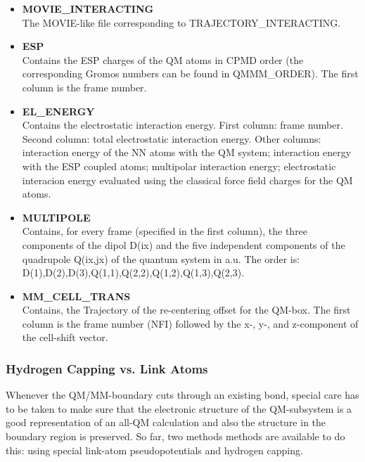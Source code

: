 \documentclass[twoside,10pt,titlepage,a4paper]{article}
\begin{document}
\begin{itemize}
\item {\bf MOVIE\_INTERACTING}\\
The MOVIE-like file corresponding to TRAJECTORY\_INTERACTING.

%
%

\item {\bf ESP}\\
Contains the ESP charges of the QM atoms in CPMD order (the corresponding Gromos
numbers can be found in QMMM\_ORDER). The first column is the frame number.


\item {\bf EL\_ENERGY}\\
Contains the electrostatic interaction energy. First column: frame number.
Second column: total electrostatic interaction energy.
Other columns: interaction energy of the NN atoms with the QM system;
interaction energy with the ESP coupled atoms;
multipolar interaction energy;
electrostatic interacion energy evaluated using
the classical force field charges for the QM atoms.

\item {\bf MULTIPOLE}\\
Contains, for every frame (specified in the first column), the three components of
the dipol D(ix) and the five independent components of the quadrupole Q(ix,jx) of
the quantum system in a.u.  The order is: D(1),D(2),D(3),Q(1,1),Q(2,2),Q(1,2),Q(1,3),Q(2,3).

\item {\bf MM\_CELL\_TRANS}\\
Contains, the Trajectory of the re-centering offset for the QM-box. The first column
is the frame number (NFI) followed by the x-, y-, and z-component of the cell-shift vector.
%
\end{itemize}

\subsubsection{Hydrogen Capping vs. Link Atoms}
\label{sec:qmmm-cut-bonds}
Whenever the QM/MM-boundary cuts through an existing bond, special
care has to be taken to make sure that the electronic structure of
the QM-subsystem is a good representation of an all-QM calculation
and also the structure in the boundary region is preserved. So far,
two methods methods are available to do this: using special link-atom
pseudopotentials and hydrogen capping.
\end{document}
